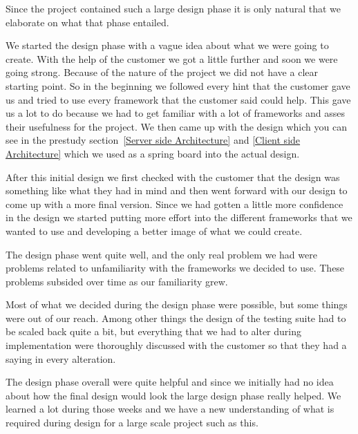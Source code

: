Since the project contained such a large design phase it is only natural that we elaborate on what that phase entailed.

We started the design phase with a vague idea about what we were going to create. With the help of the customer we got a little further and soon we were going strong. Because of the nature of the project we did not have a clear starting point. So in the beginning we followed every hint that the customer gave us and tried to use every framework that the customer said could help. This gave us a lot to do because we had to get familiar with a lot of frameworks and asses their usefulness for the project. We then came up with the design which you can see in the prestudy section~\ref{Server side Architecture} and \ref{Client side Architecture} which we used as a spring board into the actual design.

After this initial design we first checked with the customer that the design was something like what they had in mind and then went forward with our design to come up with a more final version. Since we had gotten a little more confidence in the design we started putting more effort into the different frameworks that we wanted to use and developing a better image of what we could create.

The design phase went quite well, and the only real problem we had were problems related to unfamiliarity with the frameworks we decided to use. These problems subsided over time as our familiarity grew.

Most of what we decided during the design phase were possible, but some things were out of our reach. Among other things the design of the testing suite had to be scaled back quite a bit, but everything that we had to alter during implementation were thoroughly discussed with the customer so that they had a saying in every alteration.

The design phase overall were quite helpful and since we initially had no idea about how the final design would look the large design phase really helped. We learned a lot during those weeks and we have a new understanding of what is required during design for a large scale project such as this.
